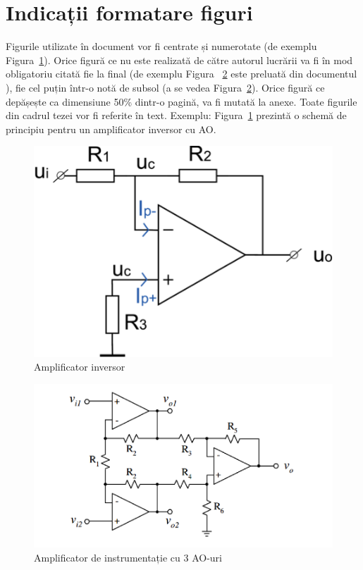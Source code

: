 \documentclass[12pt,a4paper]{report}
\begin{document}
\section{Indicații formatare figuri}

Figurile utilizate în document vor fi centrate și numerotate (de exemplu Figura~\ref{fig:pic1}). 
Orice figură ce nu este realizată de către autorul lucrării va fi în mod obligatoriu citată fie la final (de exemplu Figura ~\ref{fig:pic2} este preluată din documentul \cite{}), fie cel puțin într-o notă de subsol (a se vedea Figura~\ref{fig:pic2}). Orice figură ce depășește ca dimensiune 50\% dintr-o pagină, va fi mutată la anexe. Toate figurile din cadrul tezei vor fi referite în text. Exemplu: Figura~\ref{fig:pic1} prezintă o schemă de principiu pentru un amplificator inversor cu AO. 

\begin{figure}[th]
\centering
\includegraphics{pics/Pic1.png}
  \caption{Amplificator inversor}
  \label{fig:pic1}
\end{figure}

\newpage

\begin{figure}[th]
\centering
\includegraphics{pics/Pic2.png}
  \caption[Amplificator de instrumentație cu 3 AO-uri]{Amplificator de instrumentație cu 3 AO-uri\protect\footnotemark}
  \label{fig:pic2}
\end{figure}
\end{document}
